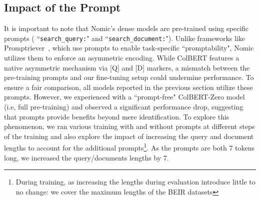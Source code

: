 \subsection{Impact of the Prompt}
\label{2602:sec:prompts}
It is important to note that Nomic's dense models are pre-trained using specific prompts ( ``\texttt{search\_query:}" and ``\texttt{search\_document:}"). Unlike frameworks like Promptriever~\cite{weller2025promptriever}, which use prompts to enable task-specific ``promptability", Nomic utilizes them to enforce an asymmetric encoding. While ColBERT features a native asymmetric mechanism via [Q] and [D] markers, a mismatch between the pre-training prompts and our fine-tuning setup could undermine performance. To ensure a fair comparison, all models reported in the previous section utilize these prompts. However, we experienced with a ``prompt-free" ColBERT-Zero model (i.e, full pre-training) and observed a significant performance drop, suggesting that prompts provide benefits beyond mere identification. To explore this phenomenon, we ran various training with and without prompts at different steps of the training and also explore the impact of increasing the query and document lengths to account for the additional prompts\footnote{During training, as increasing the lengths during evaluation introduce little to no change: we cover the maximum lengths of the BEIR datasets}. As the prompts are both 7 tokens long, we increased the query/documents lengths by 7.

